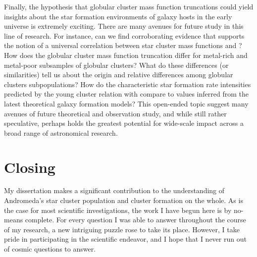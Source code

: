 Finally, the hypothesis that globular cluster mass function truncations could yield insights about the star formation environments of galaxy hosts in the early universe is extremely exciting. There are many avenues for future study in this line of research. For instance, can we find corroborating evidence that supports the notion of a universal correlation between star cluster mass functions and ? How does the globular cluster mass function truncation differ for metal-rich and metal-poor subsamples of globular clusters? What do these differences (or similarities) tell us about the origin and relative differences among globular clusters subpopulations? How do the characteristic star formation rate intensities predicted by the young cluster relation with compare to values inferred from the latest theoretical galaxy formation models? This open-ended topic suggest many avenues of future theoretical and observation study, and while still rather speculative, perhaps holds the greatest potential for wide-scale impact across a broad range of astronomical research.


\section{Closing}\label{MPSection:BC036E04-C41B-41A8-9327-3D800653C150}

My dissertation makes a significant contribution to the understanding of Andromeda's star cluster population and cluster formation on the whole. As is the case for most scientific investigations, the work I have begun here is by no-means complete. For every question I was able to answer throughout the course of my research, a new intriguing puzzle rose to take its place. However, I take pride in participating in the scientific endeavor, and I hope that I never run out of cosmic questions to answer.

